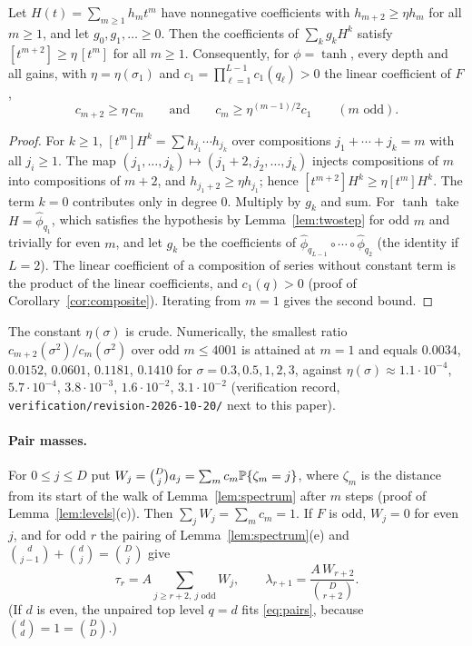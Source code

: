 \begin{lemma}[Composites]\label{lem:composite-reg}
Let $H(t)=\sum_{m\ge1}h_mt^m$ have nonnegative coefficients with
$h_{m+2}\ge\eta h_m$ for all $m\ge1$, and let $g_0,g_1,\ldots\ge0$. Then
the coefficients of $\sum_kg_kH^k$ satisfy $[t^{m+2}]\ge\eta\,[t^m]$ for
all $m\ge1$. Consequently, for $\phi=\tanh$, every depth and all gains,
with $\eta=\eta(\sigma_1)$ and $c_1=\prod_{\ell=1}^{L-1}c_1(q_\ell)>0$ the
linear coefficient of $F$,
\begin{equation}\label{eq:twostep}
 c_{m+2}\ge\eta\,c_m\qquad\text{and}\qquad c_m\ge\eta^{(m-1)/2}c_1
 \qquad(m\text{ odd}).
\end{equation}
\end{lemma}
\begin{proof}
For $k\ge1$, $[t^m]H^k=\sum h_{j_1}\cdots h_{j_k}$ over compositions
$j_1+\cdots+j_k=m$ with all $j_i\ge1$. The map
$(j_1,\ldots,j_k)\mapsto(j_1+2,j_2,\ldots,j_k)$ injects compositions of $m$
into compositions of $m+2$, and $h_{j_1+2}\ge\eta h_{j_1}$; hence
$[t^{m+2}]H^k\ge\eta[t^m]H^k$. The term $k=0$ contributes only in degree
$0$. Multiply by $g_k$ and sum. For $\tanh$ take $H=\widehat\phi_{q_1}$,
which satisfies the hypothesis by Lemma~\ref{lem:twostep} for odd $m$ and
trivially for even $m$, and let $g_k$ be the coefficients of
$\widehat\phi_{q_{L-1}}\circ\cdots\circ\widehat\phi_{q_2}$ (the identity if
$L=2$). The linear coefficient of a composition of series without constant
term is the product of the linear coefficients, and $c_1(q)>0$ (proof of
Corollary~\ref{cor:composite}). Iterating from $m=1$ gives the second bound.
\end{proof}

The constant $\eta(\sigma)$ is crude. Numerically, the smallest ratio
$c_{m+2}(\sigma^2)/c_m(\sigma^2)$ over odd $m\le4001$ is attained at $m=1$
and equals $0.0034$, $0.0152$, $0.0601$, $0.1181$, $0.1410$ for
$\sigma=0.3,0.5,1,2,3$, against $\eta(\sigma)\approx1.1\cdot10^{-4}$,
$5.7\cdot10^{-4}$, $3.8\cdot10^{-3}$, $1.6\cdot10^{-2}$, $3.1\cdot10^{-2}$
(verification record, \texttt{verification/revision-2026-10-20/} next to
this paper).

\paragraph{Pair masses.} For $0\le j\le D$ put
$W_j=\binom Dja_j=\sum_mc_m\mathbb P\{\zeta_m=j\}$, where $\zeta_m$ is the
distance from its start of the walk of Lemma~\ref{lem:spectrum} after $m$
steps (proof of Lemma~\ref{lem:levels}(c)). Then
$\sum_jW_j=\sum_mc_m=1$. If $F$ is odd, $W_j=0$ for even $j$, and for odd
$r$ the pairing of Lemma~\ref{lem:spectrum}(e) and
$\binom d{j-1}+\binom dj=\binom Dj$ give
\begin{equation}\label{eq:pairs}
 \tau_r=A\sum_{j\ge r+2,\ j\text{ odd}}W_j,\qquad
 \lambda_{r+1}=\frac{A\,W_{r+2}}{\binom D{r+2}} .
\end{equation}
(If $d$ is even, the unpaired top level $q=d$ fits \eqref{eq:pairs},
because $\binom dd=1=\binom DD$.)

